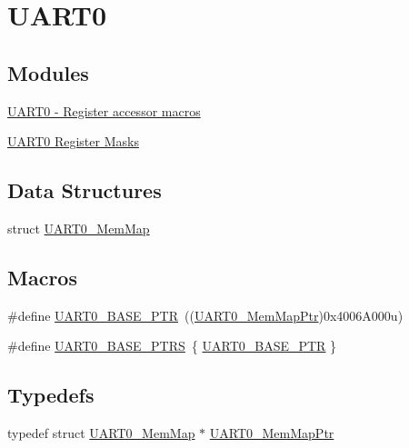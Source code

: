 \hypertarget{group___u_a_r_t0___peripheral}{}\section{U\+A\+R\+T0}
\label{group___u_a_r_t0___peripheral}
\subsection*{Modules}
\begin{DoxyCompactItemize}
\item 
\hyperlink{group___u_a_r_t0___register___accessor___macros}{U\+A\+R\+T0 -\/ Register accessor macros}
\item 
\hyperlink{group___u_a_r_t0___register___masks}{U\+A\+R\+T0 Register Masks}
\end{DoxyCompactItemize}
\subsection*{Data Structures}
\begin{DoxyCompactItemize}
\item 
struct \hyperlink{struct_u_a_r_t0___mem_map}{U\+A\+R\+T0\+\_\+\+Mem\+Map}
\end{DoxyCompactItemize}
\subsection*{Macros}
\begin{DoxyCompactItemize}
\item 
\#define \hyperlink{group___u_a_r_t0___peripheral_ga50a02c91ffbd11fa7b4f0c33fe585199}{U\+A\+R\+T0\+\_\+\+B\+A\+S\+E\+\_\+\+P\+TR}~((\hyperlink{group___u_a_r_t0___peripheral_gae795171499e041fb9b8f6ad5b97f896b}{U\+A\+R\+T0\+\_\+\+Mem\+Map\+Ptr})0x4006\+A000u)
\item 
\#define \hyperlink{group___u_a_r_t0___peripheral_ga9416d89d2bc04eb37311da5910f1c701}{U\+A\+R\+T0\+\_\+\+B\+A\+S\+E\+\_\+\+P\+T\+RS}~\{ \hyperlink{group___u_a_r_t0___peripheral_ga50a02c91ffbd11fa7b4f0c33fe585199}{U\+A\+R\+T0\+\_\+\+B\+A\+S\+E\+\_\+\+P\+TR} \}
\end{DoxyCompactItemize}
\subsection*{Typedefs}
\begin{DoxyCompactItemize}
\item 
typedef struct \hyperlink{struct_u_a_r_t0___mem_map}{U\+A\+R\+T0\+\_\+\+Mem\+Map} $\ast$ \hyperlink{group___u_a_r_t0___peripheral_gae795171499e041fb9b8f6ad5b97f896b}{U\+A\+R\+T0\+\_\+\+Mem\+Map\+Ptr}
\end{DoxyCompactItemize}


